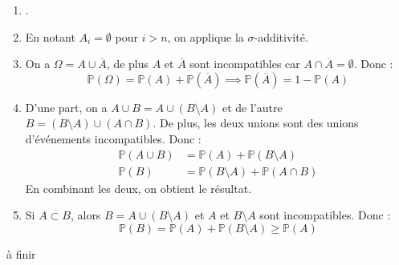 \documentclass[a4paper, 12pt]{article}
\begin{document}
\begin{demonstration}
    \begin{enumerate}[label=(\roman*)]
        \item.
        \item En notant $A_i = \emptyset$ pour $i > n$, on applique la $\sigma$-additivité.
        \item On a $\Omega = A \cup \overline{A}$, de plus $A$ et $\overline{A}$ sont incompatibles car $A \cap \overline{A} = \emptyset$.
        Donc :
        $$
        \mathbb{P}(\Omega) = \mathbb{P}(A) + \mathbb{P}(\overline{A}) \implies \mathbb{P}(\overline{A}) = 1 - \mathbb{P}(A)
        $$
        \item D'une part, on a $A \cup B = A \cup (B \setminus A)$ et de l'autre $B = (B \setminus A) \cup (A \cap B)$.
        De plus, les deux unions sont des unions d'événements incompatibles.
        Donc :
        \begin{align*}
            \mathbb{P}(A \cup B) &= \mathbb{P}(A) + \mathbb{P}(B \setminus A) \\
            \mathbb{P}(B) &= \mathbb{P}(B \setminus A) + \mathbb{P}(A \cap B)
        \end{align*}
        En combinant les deux, on obtient le résultat.
        \item Si $A \subset B$, alors $B = A \cup (B \setminus A)$ et $A$ et $B \setminus A$ sont incompatibles.
        Donc :
        $$
        \mathbb{P}(B) = \mathbb{P}(A) + \mathbb{P}(B \setminus A) \geq \mathbb{P}(A)
        $$
    \end{enumerate}
    \begin{hotwarn}
        à finir
    \end{hotwarn}
\end{demonstration}
\end{document}
